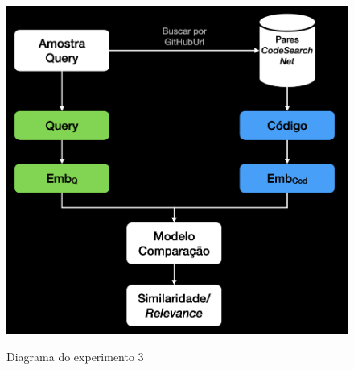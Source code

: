 \begin{figure}[H]
    \centering
        \caption{Diagrama do experimento 3}
        \includegraphics[scale=0.4]{imagens/proposta-experimental/experiment-3.png}
        \label{fig:experiment-3-diagram}
\end{figure}
